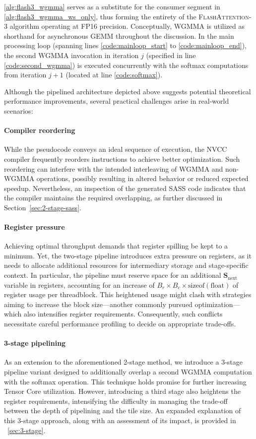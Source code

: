 \cref{alg:flash3_wgmma} serves as a substitute for the consumer segment in \cref{alg:flash3_wgmma_ws_only}, thus forming the entirety of the \textsc{FlashAttention-3} algorithm operating at FP16 precision. Conceptually, WGMMA is utilized as shorthand for asynchronous GEMM throughout the discussion. In the main processing loop (spanning lines \ref{code:mainloop_start} to \ref{code:mainloop_end}), the second WGMMA invocation in iteration $j$ (specified in line \ref{code:second_wgmma}) is executed concurrently with the softmax computations from iteration $j+1$ (located at line \ref{code:softmax}).

Although the pipelined architecture depicted above suggests potential theoretical performance improvements, several practical challenges arise in real-world scenarios:

\paragraph{Compiler reordering} While the pseudocode conveys an ideal sequence of execution, the NVCC compiler frequently reorders instructions to achieve better optimization. Such reordering can interfere with the intended interleaving of WGMMA and non-WGMMA operations, possibly resulting in altered behavior or reduced expected speedup. Nevertheless, an inspection of the generated SASS code indicates that the compiler maintains the required overlapping, as further discussed in Section~\ref{sec:2-stage-sass}.

\paragraph{Register pressure} Achieving optimal throughput demands that register spilling be kept to a minimum. Yet, the two-stage pipeline introduces extra pressure on registers, as it needs to allocate additional resources for intermediary storage and stage-specific context. In particular, the pipeline must reserve space for an additional $\mathbf{S}_{\mathrm{next}}$ variable in registers, accounting for an increase of $B_r \times B_c \times \text{sizeof}(\text{float})$ of register usage per threadblock. This heightened usage might clash with strategies aiming to increase the block size—another commonly pursued optimization—which also intensifies register requirements. Consequently, such conflicts necessitate careful performance profiling to decide on appropriate trade-offs.

\paragraph{3-stage pipelining} As an extension to the aforementioned 2-stage method, we introduce a 3-stage pipeline variant designed to additionally overlap a second WGMMA computation with the softmax operation. This technique holds promise for further increasing Tensor Core utilization. However, introducing a third stage also heightens the register requirements, intensifying the difficulty in managing the trade-off between the depth of pipelining and the tile size. An expanded explanation of this 3-stage approach, along with an assessment of its impact, is provided in ~\cref{sec:3-stage}.

